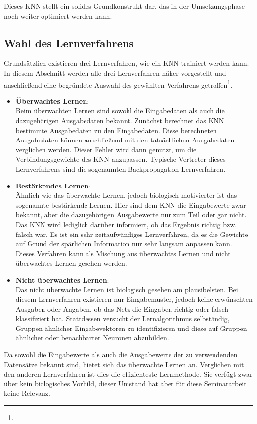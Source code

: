 Dieses KNN stellt ein solides Grundkonstrukt dar, das in der Umsetzungsphase noch weiter optimiert werden kann.

\subsection{Wahl des Lernverfahrens} 
\label{subsection:Wahl des Lernverfahrens}

Grundsätzlich existieren drei Lernverfahren, wie ein KNN trainiert werden kann. In diesem Abschnitt werden alle drei Lernverfahren näher vorgestellt und anschließend eine begründete Auswahl des gewählten Verfahrens getroffen\footnote{\Vgl{}}.

\begin{itemize}
\item \textbf{Überwachtes Lernen}: \\
Beim überwachten Lernen sind sowohl die Eingabedaten als auch die dazugehörigen Ausgabedaten bekannt. Zunächst berechnet das KNN bestimmte Ausgabedaten zu den Eingabedaten. Diese berechneten Ausgabedaten können anschließend mit den tatsächlichen Ausgabedaten verglichen werden. Dieser Fehler wird dann genutzt, um die Verbindungsgewichte des KNN anzupassen. Typische Vertreter dieses Lernverfahrens sind die sogenannten Backpropagation-Lernverfahren.
	
\item \textbf{Bestärkendes Lernen}: \\
Ähnlich wie das überwachte Lernen, jedoch biologisch motivierter ist das sogenannte bestärkende Lernen. Hier sind dem KNN die Eingabewerte zwar bekannt, aber die dazugehörigen Ausgabewerte nur zum Teil oder gar nicht. Das KNN wird lediglich darüber informiert, ob das Ergebnis richtig bzw. falsch war. Es ist ein sehr zeitaufwändiges Lernverfahren, da es die Gewichte auf Grund der spärlichen Information nur sehr langsam anpassen kann. Dieses Verfahren kann als Mischung aus überwachtes Lernen und nicht überwachtes Lernen gesehen werden.

\item \textbf{Nicht überwachtes Lernen}: \\
Das nicht überwachte Lernen ist biologisch gesehen am plausibelsten. Bei diesem  Lernverfahren existieren nur Eingabemuster, jedoch keine erwünschten Ausgaben oder Angaben, ob das Netz die Eingaben richtig oder falsch klassifiziert hat. Stattdessen versucht der Lernalgorithmus selbständig, Gruppen ähnlicher Eingabevektoren zu identifizieren und diese auf Gruppen ähnlicher oder benachbarter Neuronen abzubilden. 
\end{itemize}

Da sowohl die Eingabewerte als auch die Ausgabewerte der zu verwendenden Datensätze bekannt sind, bietet sich das überwachte Lernen an. Verglichen mit den anderen Lernverfahren ist dies die effizienteste Lernmethode. Sie verfügt zwar über kein biologisches Vorbild, dieser Umstand hat aber für diese Seminararbeit keine Relevanz.
